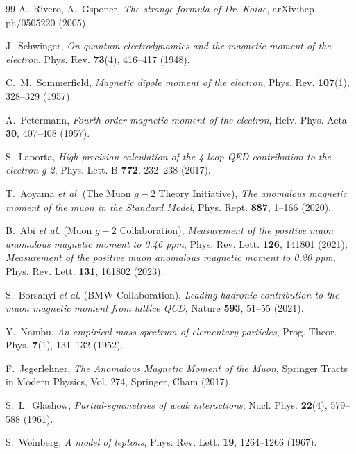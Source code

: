 \documentclass[12pt,a4paper]{article}
\theoremstyle{definition}
\theoremstyle{remark}
\begin{document}
\begin{thebibliography}{99}
	A.~Rivero, A.~Gsponer, \textit{The strange formula of Dr. Koide}, arXiv:hep-ph/0505220 (2005).
	
	J.~Schwinger, \textit{On quantum-electrodynamics and the magnetic moment of the electron}, Phys. Rev. \textbf{73}(4), 416--417 (1948).
	
	C.~M.~Sommerfield, \textit{Magnetic dipole moment of the electron}, Phys. Rev. \textbf{107}(1), 328--329 (1957).
	
	A.~Petermann, \textit{Fourth order magnetic moment of the electron}, Helv. Phys. Acta \textbf{30}, 407--408 (1957).
	
	S.~Laporta, \textit{High-precision calculation of the 4-loop QED contribution to the electron g-2}, Phys. Lett. B \textbf{772}, 232--238 (2017).
	
	T.~Aoyama \textit{et al.} (The Muon $g-2$ Theory Initiative), \textit{The anomalous magnetic moment of the muon in the Standard Model}, Phys. Rept. \textbf{887}, 1--166 (2020).
	
	B.~Abi \textit{et al.} (Muon $g-2$ Collaboration), \textit{Measurement of the positive muon anomalous magnetic moment to 0.46 ppm}, Phys. Rev. Lett. \textbf{126}, 141801 (2021); \textit{Measurement of the positive muon anomalous magnetic moment to 0.20 ppm}, Phys. Rev. Lett. \textbf{131}, 161802 (2023).
	
	S.~Borsanyi \textit{et al.} (BMW Collaboration), \textit{Leading hadronic contribution to the muon magnetic moment from lattice QCD}, Nature \textbf{593}, 51--55 (2021).
	
	Y.~Nambu, \textit{An empirical mass spectrum of elementary particles}, Prog. Theor. Phys. \textbf{7}(1), 131--132 (1952).
	
	F.~Jegerlehner, \textit{The Anomalous Magnetic Moment of the Muon}, Springer Tracts in Modern Physics, Vol. 274, Springer, Cham (2017).
	
	S.~L.~Glashow, \textit{Partial-symmetries of weak interactions}, Nucl. Phys. \textbf{22}(4), 579--588 (1961).
	
	S.~Weinberg, \textit{A model of leptons}, Phys. Rev. Lett. \textbf{19}, 1264--1266 (1967).
	

\end{thebibliography}
\end{document}
